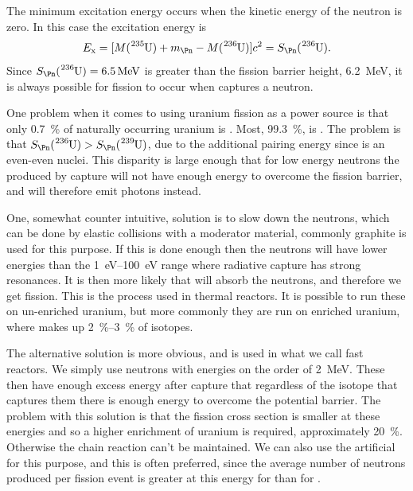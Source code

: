 \documentclass[fleqn]{NotesClass}
\begin{document}
    The minimum excitation energy occurs when the kinetic energy of the neutron is zero.
    In this case the excitation energy is
    \begin{equation}
        E_{\mathrm{x}} = [M(\ce{^235U}) + m_{\Pn} - M(\ce{^{236}U})]c^2 = S_{\Pn}(\ce{^236U}).
    \end{equation}
    Since \(S_\Pn(\ce{^{236}U}) = \qty{6.5}{\MeV}\) is greater than the fission barrier height, \qty{6.2}{\MeV}, it is always possible for fission to occur when  captures a neutron.
    
    One problem when it comes to using uranium fission as a power source is that only \qty{0.7}{\percent} of naturally occurring uranium is .
    Most, \qty{99.3}{\percent}, is .
    The problem is that \(S_{\Pn}(\ce{^236U}) > S_{\Pn}(\ce{^239U})\), due to the additional pairing energy since  is an even-even nuclei.
    This disparity is large enough that for low energy neutrons the  produced by capture will not have enough energy to overcome the fission barrier, and will therefore emit photons instead.
    
    One, somewhat counter intuitive, solution is to slow down the neutrons, which can be done by elastic collisions with a moderator material, commonly graphite is used for this purpose.
    If this is done enough then the neutrons will have lower energies than the \qtyrange{1}{100}{\electronvolt} range where radiative capture has strong resonances.
    It is then more likely that  will absorb the neutrons, and therefore we get fission.
    This is the process used in thermal reactors.
    It is possible to run these on un-enriched uranium, but more commonly they are run on enriched uranium, where  makes up \qtyrange{2}{3}{\percent} of isotopes.
    
    The alternative solution is more obvious, and is used in what we call fast reactors.
    We simply use neutrons with energies on the order of \qty{2}{\MeV}.
    These then have enough excess energy after capture that regardless of the isotope that captures them there is enough energy to overcome the potential barrier.
    The problem with this solution is that the fission cross section is smaller at these energies and so a higher enrichment of uranium is required, approximately \qty{20}{\percent}.
    Otherwise the chain reaction can't be maintained.
    We can also use the artificial  for this purpose, and this is often preferred, since the average number of neutrons produced per fission event is greater at this energy for  than for .
    
\end{document}
